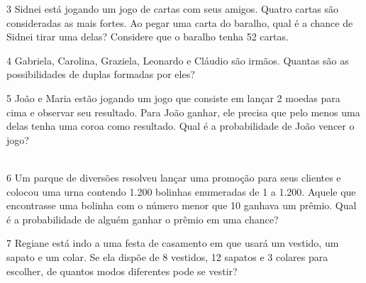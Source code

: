 




\vspace{2cm}

\num{3} Sidnei está jogando um jogo de cartas com seus amigos. Quatro cartas são
consideradas as mais fortes. Ao pegar uma carta do baralho, qual é a
chance de Sidnei tirar uma delas? Considere que o baralho tenha 52
cartas.


\num{4} Gabriela, Carolina, Graziela, Leonardo e Cláudio são irmãos. Quantas são
as possibilidades de duplas formadas por eles?


\num{5} João e Maria estão jogando um jogo que consiste em lançar 2 moedas
para cima e observar seu resultado. Para João ganhar, ele precisa que
pelo menos uma delas tenha uma coroa como resultado. Qual é a
probabilidade de João vencer o jogo?

\\

\num{6} Um parque de diversões resolveu lançar uma promoção para seus
clientes e colocou uma urna contendo 1.200 bolinhas enumeradas de 1 a
1.200. Aquele que encontrasse uma bolinha com o número menor que 10
ganhava um prêmio. Qual é a probabilidade de alguém ganhar o prêmio em
uma chance?


\num{7} Regiane está indo a uma festa de casamento em que usará um
vestido, um sapato e um colar. Se ela dispõe de 8 vestidos, 12 sapatos e
3 colares para escolher, de quantos modos diferentes pode se vestir?


